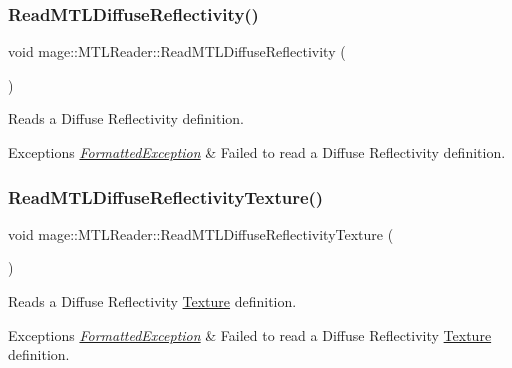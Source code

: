 \subsubsection{\texorpdfstring{Read\+M\+T\+L\+Diffuse\+Reflectivity()}{ReadMTLDiffuseReflectivity()}}
{\footnotesize\ttfamily void mage\+::\+M\+T\+L\+Reader\+::\+Read\+M\+T\+L\+Diffuse\+Reflectivity (\begin{DoxyParamCaption}{ }\end{DoxyParamCaption})\hspace{0.3cm}{\ttfamily [private]}}

Reads a Diffuse Reflectivity definition.


\begin{DoxyExceptions}{Exceptions}
{\em \hyperlink{structmage_1_1_formatted_exception}{Formatted\+Exception}} & Failed to read a Diffuse Reflectivity definition. \\
\hline
\end{DoxyExceptions}
\hypertarget{classmage_1_1_m_t_l_reader_ad941332bf48f9fd9f7c4cecf5ae6ccc4}{}\label{classmage_1_1_m_t_l_reader_ad941332bf48f9fd9f7c4cecf5ae6ccc4} 
\subsubsection{\texorpdfstring{Read\+M\+T\+L\+Diffuse\+Reflectivity\+Texture()}{ReadMTLDiffuseReflectivityTexture()}}
{\footnotesize\ttfamily void mage\+::\+M\+T\+L\+Reader\+::\+Read\+M\+T\+L\+Diffuse\+Reflectivity\+Texture (\begin{DoxyParamCaption}{ }\end{DoxyParamCaption})\hspace{0.3cm}{\ttfamily [private]}}

Reads a Diffuse Reflectivity \hyperlink{classmage_1_1_texture}{Texture} definition.


\begin{DoxyExceptions}{Exceptions}
{\em \hyperlink{structmage_1_1_formatted_exception}{Formatted\+Exception}} & Failed to read a Diffuse Reflectivity \hyperlink{classmage_1_1_texture}{Texture} definition. \\
\hline
\end{DoxyExceptions}
\hypertarget{classmage_1_1_m_t_l_reader_a9d4f8dea5a5582c5e7b788149110800c}{}\label{classmage_1_1_m_t_l_reader_a9d4f8dea5a5582c5e7b788149110800c} 
